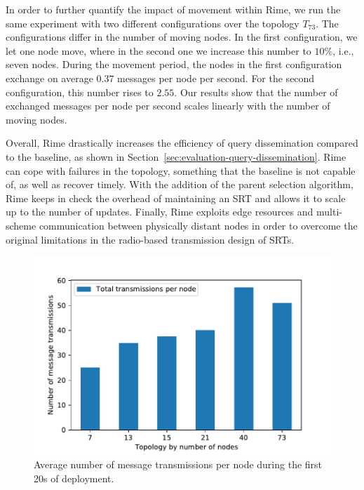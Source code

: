 In order to further quantify the impact of movement within Rime, we run the same experiment with two different configurations over the topology $T_{73}$. The configurations differ in the number of moving nodes. In the first configuration, we let one node move, where in the second one we increase this number to $10\%$, i.e., seven nodes. During the movement period, the nodes in the first configuration exchange on average $0.37$ messages per node per second. For the second configuration, this number rises to $2.55$. Our results show that the number of exchanged messages per node per second scales linearly with the number of moving nodes.

Overall, Rime drastically increases the efficiency of query dissemination compared to the baseline, as shown in Section~\ref{sec:evaluation-query-dissemination}. Rime can cope with failures in the topology, something that the baseline is not capable of, as well as recover timely. With the addition of the parent selection algorithm, Rime keeps in check the overhead of maintaining an SRT
and allows it to scale up to the number of updates.
Finally, Rime exploits edge resources and multi-scheme communication between physically distant nodes in order to overcome the original limitations in the radio-based transmission design of SRTs.

\begin{figure}[t]
  \label{fig:init-messages}        
  \includegraphics[width=.5\textwidth]{img/evaluation/vliot/maintenance-init-msgs-per-node.pdf}
  \caption{Average number of message transmissions per node during the first 20s of deployment.}
  \label{fig:avg-overhead-per-node}   
\end{figure} 
